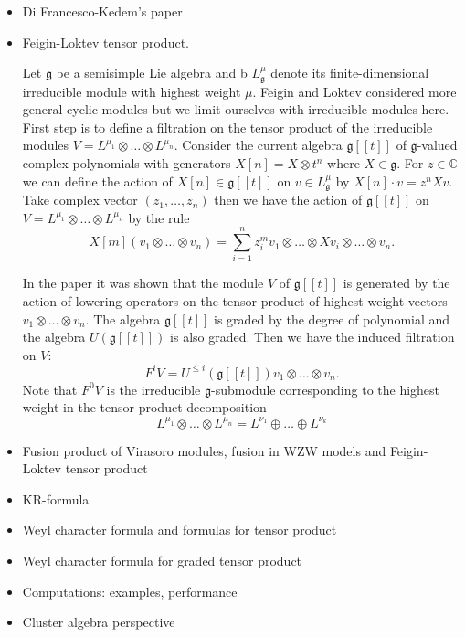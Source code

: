 \documentclass[12pt]{iopart}
\newcommand{\gf}{\mathfrak{g}}
\begin{document}
\begin{itemize}
\item Di Francesco-Kedem's paper
\item Feigin-Loktev tensor product.
  
  Let $\gf$ be a semisimple Lie algebra and b $L^{\mu}_{\gf}$ denote its finite-dimensional
  irreducible module with highest weight $\mu$. Feigin and Loktev considered more general cyclic
  modules but we limit ourselves with irreducible modules here. First step is to define a filtration
  on the tensor product of the irreducible modules $V=L^{\mu_{1}}\otimes\dots \otimes L^{\mu_{n}}$.
  Consider the current algebra $\gf[[t]]$ of $\gf$-valued complex polynomials with generators
  $X[n]=X\otimes t^{n}$ where $X\in \gf$. For $z\in\mathbb{C}$ we can define the action of $X[n]\in
  \gf[[t]]$ on $v\in L^{\mu}_{\gf}$ by $X[n]\cdot v = z^{n}X v$. Take complex vector
  $(z_{1},\dots,z_{n})$ then we have the action of $\gf[[t]]$ on $V=L^{\mu_{1}}\otimes\dots \otimes
  L^{\mu_{n}}$ by the rule
  \begin{equation}
    \label{eq:1}
    X[m](v_{1}\otimes \dots\otimes v_{n})=\sum_{i=1}^{n} z_{i}^{m}
    v_{1}\otimes\dots\otimes X v_{i}\otimes\dots\otimes v_{n}.    
  \end{equation}

 In the paper \cite{feigin1999generalized} it was shown that the module $V$ of $\gf[[t]]$ is
 generated by the action of lowering operators on the tensor product of highest weight vectors
 $v_{1}\otimes\dots \otimes v_{n}$. The algebra $\gf[[t]]$ is graded by the degree of polynomial
 and the algebra $U(\gf[[t]])$ is also graded. Then we have the induced filtration on $V$:
 \begin{equation}
   \label{eq:2}
   F^{i}V=U^{\leq i}(\gf[[t]])v_{1}\otimes\dots\otimes v_{n}.
 \end{equation}
 Note that $F^{0}V$ is the irreducible $\gf$-submodule corresponding to the highest weight in the
 tensor product decomposition
 \begin{equation}
   \label{eq:3}
   L^{\mu_{1}}\otimes\dots \otimes L^{\mu_{n}}=L^{\nu_{1}}\oplus\dots\oplus L^{\nu_{k}}
 \end{equation}



\item Fusion product of Virasoro modules, fusion in WZW models and Feigin-Loktev tensor product 
\item KR-formula
\item Weyl character formula and formulas for tensor product
\item Weyl character formula for graded tensor product
\item Computations: examples, performance
\item Cluster algebra perspective
\end{itemize}

\cite{di2013quantum} 
{} 

\end{document}
